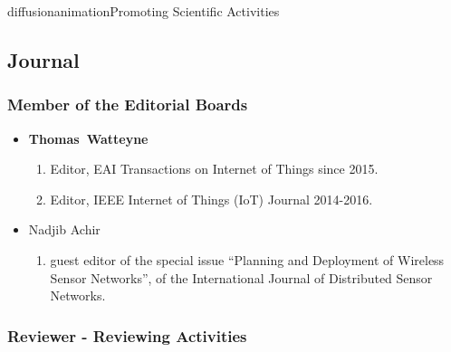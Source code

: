 \documentclass{ra2016}
\newcommand{\thomas}           {\textbf{Thomas~Watteyne}}
\begin{document}
\begin{module}{diffusion}{animation}{Promoting Scientific Activities}
\subsection{Journal}

\subsubsection{Member of the Editorial Boards}

\begin{itemize}
    \item \thomas
        \begin{enumerate}
            \item Editor, EAI Transactions on Internet of Things since 2015.
            \item Editor, IEEE Internet of Things (IoT) Journal 2014-2016.
        \end{enumerate}
    \item Nadjib Achir
        \begin{enumerate}
            \item guest editor  of the special issue ``Planning and Deployment of Wireless Sensor Networks'', of the International Journal of Distributed Sensor Networks.
        \end{enumerate}
\end{itemize}

\subsubsection{Reviewer - Reviewing Activities}
 

\end{module}
\end{document}
